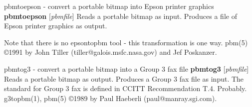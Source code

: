 %

\newpage
%

pbmtoepson - convert a portable bitmap into Epson printer graphics
{\bf pbmtoepson}
{\rm [}{\it pbmfile}{\rm ]}
Reads a portable bitmap as input.
Produces a file of Epson printer graphics as output.
\par
Note that there is no epsontopbm tool - this transformation is one way.
pbm(5)
\copyright 1991 by John Tiller (tiller@galois.msfc.nasa.gov) and Jef Poskanzer.
%
 
%

\newpage
%

pbmtog3 - convert a portable bitmap into a Group 3 fax file
{\bf pbmtog3}
{\rm [}{\it pbmfile}{\rm ]}
Reads a portable bitmap as output.
Produces a Group 3 fax file as input.
The standard for Group 3 fax is defined in CCITT Recommendation T.4.
Probably.
g3topbm(1), pbm(5)
\copyright 1989 by Paul Haeberli (paul@manray.sgi.com).
%
 
